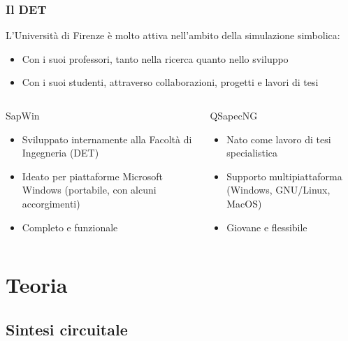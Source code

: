 
\begin{frame}
 \frametitle{Il DET}
 L'Università di Firenze è molto attiva nell'ambito della simulazione simbolica:
 \begin{itemize}
  \item Con i suoi professori, tanto nella ricerca quanto nello sviluppo
  \item Con i suoi studenti, attraverso collaborazioni, progetti e lavori di tesi
 \end{itemize}

 \begin{columns}
   \begin{block}{SapWin}
     \begin{itemize}
      \item Sviluppato internamente alla Facoltà di Ingegneria (DET)
      \item Ideato per piattaforme Microsoft Windows (portabile, con alcuni accorgimenti)
      \item Completo e funzionale
     \end{itemize}
   \end{block}
   \begin{block}{QSapecNG}
     \begin{itemize}
      \item Nato come lavoro di tesi specialistica
      \item Supporto multipiattaforma (Windows, GNU/Linux, MacOS)
      \item Giovane e flessibile
     \end{itemize}
   \end{block}
 \end{columns}

\end{frame}


\section{Teoria}

\subsection{Sintesi circuitale}


